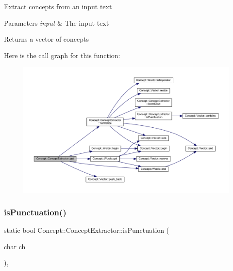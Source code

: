 Extract concepts from an input text 
\begin{DoxyParams}{Parameters}
{\em input} & The input text \\
\hline
\end{DoxyParams}
\begin{DoxyReturn}{Returns}
a vector of concepts 
\end{DoxyReturn}
Here is the call graph for this function\+:\nopagebreak
\begin{figure}[H]
\begin{center}
\leavevmode
\includegraphics[width=350pt]{class_concept_1_1_concept_extractor_a34afbe33a9c98d648df5976202ac05cf_cgraph}
\end{center}
\end{figure}
\mbox{\label{class_concept_1_1_concept_extractor_ab4ca9179d4756d3d68b47c7256aea880}} 
\subsubsection{\texorpdfstring{isPunctuation()}{isPunctuation()}}
{\footnotesize\ttfamily static bool Concept\+::\+Concept\+Extractor\+::is\+Punctuation (\begin{DoxyParamCaption}\item[{char}]{ch }\end{DoxyParamCaption})\hspace{0.3cm}{\ttfamily [inline]}, {\ttfamily [static]}}


